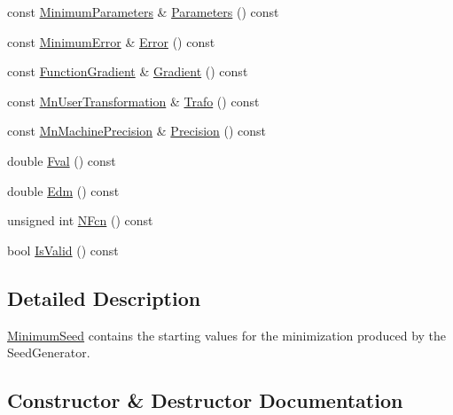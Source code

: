 \begin{DoxyCompactItemize}
\item 
const \mbox{\hyperlink{classROOT_1_1Minuit2_1_1MinimumParameters}{Minimum\+Parameters}} \& \mbox{\hyperlink{classROOT_1_1Minuit2_1_1MinimumSeed_a994d60b61e96fefc68cbccab8f82794d}{Parameters}} () const
\item 
const \mbox{\hyperlink{classROOT_1_1Minuit2_1_1MinimumError}{Minimum\+Error}} \& \mbox{\hyperlink{classROOT_1_1Minuit2_1_1MinimumSeed_a19cc15c1feb45267a1a8b2cdb4f25ac2}{Error}} () const
\item 
const \mbox{\hyperlink{classROOT_1_1Minuit2_1_1FunctionGradient}{Function\+Gradient}} \& \mbox{\hyperlink{classROOT_1_1Minuit2_1_1MinimumSeed_acde7a067ded2fb87a3dba51ba82a1afd}{Gradient}} () const
\item 
const \mbox{\hyperlink{classROOT_1_1Minuit2_1_1MnUserTransformation}{Mn\+User\+Transformation}} \& \mbox{\hyperlink{classROOT_1_1Minuit2_1_1MinimumSeed_a140162d25593e6675f6f521fc9d5fc84}{Trafo}} () const
\item 
const \mbox{\hyperlink{classROOT_1_1Minuit2_1_1MnMachinePrecision}{Mn\+Machine\+Precision}} \& \mbox{\hyperlink{classROOT_1_1Minuit2_1_1MinimumSeed_a0cc83616e61f2d3552cedf34ed09e361}{Precision}} () const
\item 
double \mbox{\hyperlink{classROOT_1_1Minuit2_1_1MinimumSeed_a55c498b499c84f1a693729aa269db9aa}{Fval}} () const
\item 
double \mbox{\hyperlink{classROOT_1_1Minuit2_1_1MinimumSeed_ab378accd110c0313557d3e916e2a9282}{Edm}} () const
\item 
unsigned int \mbox{\hyperlink{classROOT_1_1Minuit2_1_1MinimumSeed_a095d402b58fea6b0b06323b079974bf3}{N\+Fcn}} () const
\item 
bool \mbox{\hyperlink{classROOT_1_1Minuit2_1_1MinimumSeed_a5d9ffd4dbd68f6cfcfef821844e70158}{Is\+Valid}} () const
\end{DoxyCompactItemize}


\subsection{Detailed Description}
\mbox{\hyperlink{classROOT_1_1Minuit2_1_1MinimumSeed}{Minimum\+Seed}} contains the starting values for the minimization produced by the Seed\+Generator. 

\subsection{Constructor \& Destructor Documentation}
\mbox{\label{classROOT_1_1Minuit2_1_1MinimumSeed_a0d3070cfaa1be8ce9e9e64f39a30b875}} 
